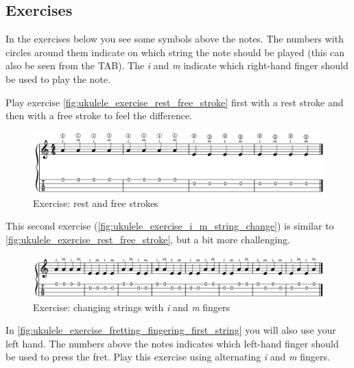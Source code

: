 \newpage

\subsection{Exercises}

In the exercises below you see some symbols above the notes. The numbers with circles around them indicate on which string the note should be played (this can also be seen from the TAB). The \textit{i} and \textit{m} indicate which right-hand finger should be used to play the note.

Play exercise \autoref{fig:ukulele_exercise_rest_free_stroke} first with a rest stroke and then with a free stroke to feel the difference.

\begin{figure}[h]
    \centering
    \includegraphics[width=\textwidth]{../../MuseScore/Ukulele/UkuleleExerciseFreeAndRestStokeSimple.png}
    \caption{Exercise: rest and free strokes}
    \label{fig:ukulele_exercise_rest_free_stroke}
\end{figure}

This second exercise (\autoref{fig:ukulele_exercise_i_m_string_change}) is similar to \autoref{fig:ukulele_exercise_rest_free_stroke}, but a bit more challenging.

\begin{figure}[h]
    \centering
    \includegraphics[width=\textwidth]{../../MuseScore/Ukulele/UkuleleExerciseFreeAndRestStokeStepTwo.png}
    \caption{Exercise: changing strings with \textit{i} and \textit{m} fingers}
    \label{fig:ukulele_exercise_i_m_string_change}
\end{figure}

\newpage

In \autoref{fig:ukulele_exercise_fretting_fingering_first_string} you will also use your left hand. The numbers above the notes indicates which left-hand finger should be used to press the fret. Play this exercise using alternating \textit{i} and \textit{m} fingers. 

